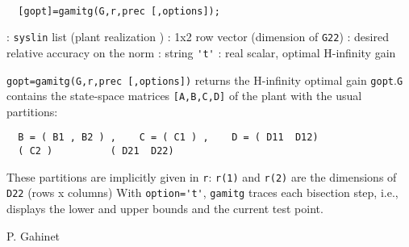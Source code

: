 \begin{mandesc}
   \\ %
\end{mandesc}
\begin{calling_sequence}
\begin{verbatim}
  [gopt]=gamitg(G,r,prec [,options]);  
\end{verbatim}
\end{calling_sequence}
\begin{parameters}
  \begin{varlist}
    : \verb!syslin! list (plant realization )
    : 1x2 row vector (dimension of \verb!G22!)
    : desired relative accuracy on the norm
    : string \verb!'t'!
    : real scalar, optimal H-infinity gain
  \end{varlist}
\end{parameters}
\begin{mandescription}
  \verb!gopt=gamitg(G,r,prec [,options])!
  returns the H-infinity optimal gain \verb!gopt!.\verb!G! contains the state-space matrices \verb![A,B,C,D]! of
  the plant with the usual partitions:
\begin{verbatim}
  B = ( B1 , B2 ) ,    C = ( C1 ) ,    D = ( D11  D12)
  ( C2 )          ( D21  D22)
\end{verbatim}
  These partitions are implicitly given in \verb!r!: \verb!r(1)!
  and \verb!r(2)! are the dimensions of \verb!D22! (rows x columns)
  With \verb!option='t'!, \verb!gamitg! traces each bisection step, i.e., 
  displays the lower and upper bounds and the current test point.
\end{mandescription}
\begin{manseealso}
     
\end{manseealso}
\begin{authors}
  P. Gahinet
\end{authors}
